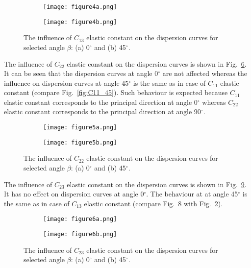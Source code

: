 \documentclass[preprint,12pt]{elsarticle}
\begin{document}
\begin{figure} [h!]
	\centering
	\begin{subfigure}[b]{0.47\textwidth}
		\centering
		\texttt{[image: figure4a.png]}
		\caption{}
		\label{fig:C13_0}
	\end{subfigure}
	\hfill
	\begin{subfigure}[b]{0.47\textwidth}
		\centering
		\texttt{[image: figure4b.png]}
		\caption{}
		\label{fig:C13_45}
	\end{subfigure}
 	\caption{The influence of \(C_{13}\) elastic constant on the dispersion curves for selected angle \(\beta\): (a) 0\(^{\circ}\) and (b) 45\(^{\circ}\).} 
	\label{fig:C13}
\end{figure}

 The influence of \(C_{22}\) elastic constant on the dispersion curves is shown in Fig.~\ref{fig:C22}.
 It can be seen that the dispersion curves at angle 0\(^{\circ}\) are not affected whereas the influence on dispersion curves at  angle 45\(^{\circ}\) is the same as in case of  \(C_{11}\) elastic constant (compare Fig.~\ref{fig:C11_45}). 
 Such behaviour is expected because \(C_{11}\) elastic constant corresponds to the principal direction at angle 0\(^{\circ}\) whereas \(C_{22}\) elastic constant corresponds to the principal direction at angle 90\(^{\circ}\).
 
\begin{figure} [h!]
	\centering
	\begin{subfigure}[b]{0.47\textwidth}
		\centering
		\texttt{[image: figure5a.png]}
		\caption{}
		\label{fig:C22_0}
	\end{subfigure}
	\hfill
	\begin{subfigure}[b]{0.47\textwidth}
		\centering
		\texttt{[image: figure5b.png]}
		\caption{}
		\label{fig:C22_45}
	\end{subfigure}
 	\caption{The influence of \(C_{22}\) elastic constant on the dispersion curves for selected angle \(\beta\): (a) 0\(^{\circ}\) and (b) 45\(^{\circ}\).} 
	\label{fig:C22}
\end{figure}

 The influence of \(C_{23}\) elastic constant on the dispersion curves is shown in Fig.~\ref{fig:C23}.
 It has no effect on dispersion curves at angle 0\(^{\circ}\).
 The behaviour at at angle 45\(^{\circ}\) is the same as in case of \(C_{13}\) elastic constant (compare Fig.~\ref{fig:C23_45} with Fig.~\ref{fig:C13_45}).
 
\begin{figure} [h!]
	\centering
	\begin{subfigure}[b]{0.47\textwidth}
		\centering
		\texttt{[image: figure6a.png]}
		\caption{}
		\label{fig:C23_0}
	\end{subfigure}
	\hfill
	\begin{subfigure}[b]{0.47\textwidth}
		\centering
		\texttt{[image: figure6b.png]}
		\caption{}
		\label{fig:C23_45}
	\end{subfigure}
 	\caption{The influence of \(C_{23}\) elastic constant on the dispersion curves for selected angle \(\beta\): (a) 0\(^{\circ}\) and (b) 45\(^{\circ}\).} 
	\label{fig:C23}
\end{figure}
\end{document}

